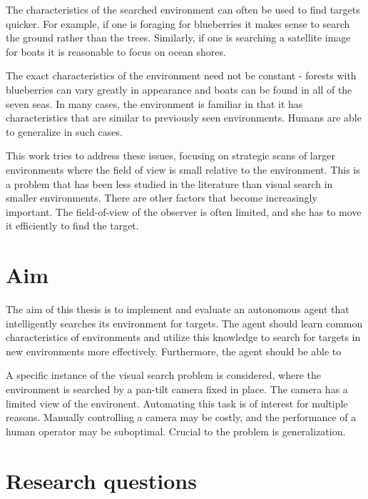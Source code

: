 The characteristics of the searched environment can often be used to find targets quicker. For example, if one is foraging for blueberries it makes sense to search the ground rather than the trees. Similarly, if one is searching a satellite image for boats it is reasonable to focus on ocean shores.

The exact characteristics of the environment need not be constant - forests with blueberries can vary greatly in appearance and boats can be found in all of the seven seas. In many cases, the environment is familiar in that it has characteristics that are similar to previously seen environments. Humans are able to generalize in such cases.



This work tries to address these issues, focusing on strategic scans of larger environments where the field of view is small relative to the environment. This is a problem that has been less studied in the literature than visual search in smaller environments. There are other factors that become increasingly important. The field-of-view of the observer is often limited, and she has to move it efficiently to find the target.


\section{Aim}
\label{sec:aim}

The aim of this thesis is to implement and evaluate an autonomous agent that intelligently searches its environment for targets. The agent should learn common characteristics of environments and utilize this knowledge to search for targets in new environments more effectively. Furthermore, the agent should be able to 

A specific instance of the visual search problem is considered, where the environment is searched by a pan-tilt camera fixed in place. The camera has a limited view of the environent. Automating this task is of interest for multiple reasons. Manually controlling a camera may be costly, and the performance of a human operator may be suboptimal. Crucial to the problem is generalization.

\section{Research questions}
\label{sec:research-questions}

